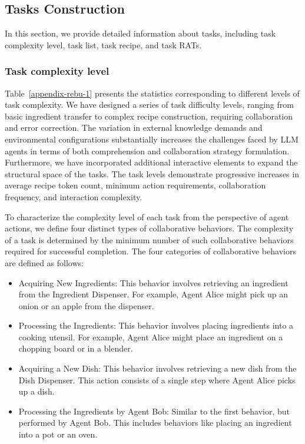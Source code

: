 \documentclass[11pt]{article}
\begin{document}
\subsection{Tasks Construction}
\label{ap-task-construction}

In this section, we provide detailed information about tasks, including task complexity level, task list, task recipe, and task RATs.


\subsubsection{Task complexity level}

Table~\ref{appendix-rebu-1} presents the statistics corresponding to different levels of task complexity. We have designed a series of task difficulty levels, ranging from basic ingredient transfer to complex recipe construction, requiring collaboration and error correction. The variation in external knowledge demands and environmental configurations substantially increases the challenges faced by LLM agents in terms of both comprehension and collaboration strategy formulation. Furthermore, we have incorporated additional interactive elements to expand the structural space of the tasks. The task levels demonstrate progressive increases in average recipe token count, minimum action requirements, collaboration frequency, and interaction complexity.

To characterize the complexity level of each task from the perspective of agent actions, we define four distinct types of collaborative behaviors. The complexity of a task is determined by the minimum number of such collaborative behaviors required for successful completion. The four categories of collaborative behaviors are defined as follows:

\begin{itemize} 

\item[$\bullet$] Acquiring New Ingredients: This behavior involves retrieving an ingredient from the Ingredient Dispenser. For example, Agent Alice might pick up an onion or an apple from the dispenser.

\item[$\bullet$] Processing the Ingredients: This behavior involves placing ingredients into a cooking utensil. For example, Agent Alice might place an ingredient on a chopping board or in a blender.

\item[$\bullet$] Acquiring a New Dish: This behavior involves retrieving a new dish from the Dish Dispenser. This action consists of a single step where Agent Alice picks up a dish.

\item[$\bullet$] Processing the Ingredients by Agent Bob: Similar to the first behavior, but performed by Agent Bob. This includes behaviors like placing an ingredient into a pot or an oven.
\end{itemize}
\end{document}
